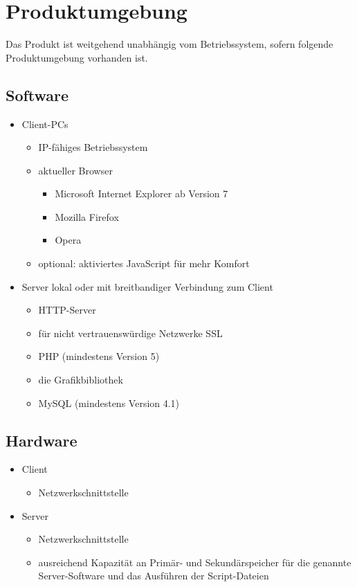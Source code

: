 \documentclass[a4paper,oneside,10pt]{scrreprt}
\begin{document}
\chapter{Produktumgebung}

Das Produkt ist weitgehend unabhängig vom Betriebssystem, sofern folgende Produktumgebung vorhanden ist.

\section{Software}

\begin{itemize}
\item Client-PCs
    \begin{itemize}
    \item IP-fähiges Betriebssystem
    \item aktueller Browser
        \begin{itemize}
        \item Microsoft Internet Explorer ab Version 7
        \item Mozilla Firefox
        \item Opera
        \end{itemize}
    \item optional: aktiviertes JavaScript für mehr Komfort
    \end{itemize}

\item Server lokal oder mit breitbandiger Verbindung zum Client
    \begin{itemize}
    \item HTTP-Server
    \item für nicht vertrauenswürdige Netzwerke SSL
    \item PHP (mindestens Version 5)
    \item die Grafikbibliothek
    \item MySQL (mindestens Version 4.1)
    \end{itemize}
\end{itemize}

\section{Hardware}

\begin{itemize}
\item Client
    \begin{itemize}
    \item Netzwerkschnittstelle
    \end{itemize}
\item Server
    \begin{itemize}
    \item Netzwerkschnittstelle
    \item ausreichend Kapazität an Primär- und Sekundärspeicher für die genannte Server-Software und das Ausführen der Script-Dateien
    \end{itemize}
\end{itemize}
\end{document}
